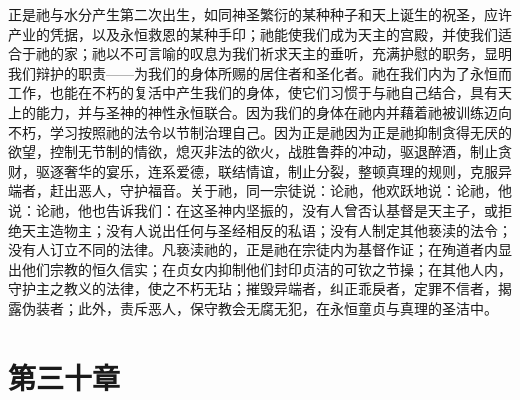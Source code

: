 正是祂与水分产生第二次出生，如同神圣繁衍的某种种子和天上诞生的祝圣，应许产业的凭据，以及永恒救恩的某种手印；祂能使我们成为天主的宫殿，并使我们适合于祂的家；祂以不可言喻的叹息为我们祈求天主的垂听，充满护慰的职务，显明我们辩护的职责——为我们的身体所赐的居住者和圣化者。祂在我们内为了永恒而工作，也能在不朽的复活中产生我们的身体，使它们习惯于与祂自己结合，具有天上的能力，并与圣神的神性永恒联合。因为我们的身体在祂内并藉着祂被训练迈向不朽，学习按照祂的法令以节制治理自己。因为正是祂因为正是祂抑制贪得无厌的欲望，控制无节制的情欲，熄灭非法的欲火，战胜鲁莽的冲动，驱退醉酒，制止贪财，驱逐奢华的宴乐，连系爱德，联结情谊，制止分裂，整顿真理的规则，克服异端者，赶出恶人，守护福音。关于祂，同一宗徒说：论祂，他欢跃地说：论祂，他说：论祂，他也告诉我们：在这圣神内坚振的，没有人曾否认基督是天主子，或拒绝天主造物主；没有人说出任何与圣经相反的私语；没有人制定其他亵渎的法令；没有人订立不同的法律。凡亵渎祂的，正是祂在宗徒内为基督作证；在殉道者内显出他们宗教的恒久信实；在贞女内抑制他们封印贞洁的可钦之节操；在其他人内，守护主之教义的法律，使之不朽无玷；摧毁异端者，纠正乖戾者，定罪不信者，揭露伪装者；此外，责斥恶人，保守教会无腐无犯，在永恒童贞与真理的圣洁中。\par


\section{第三十章}

\par

